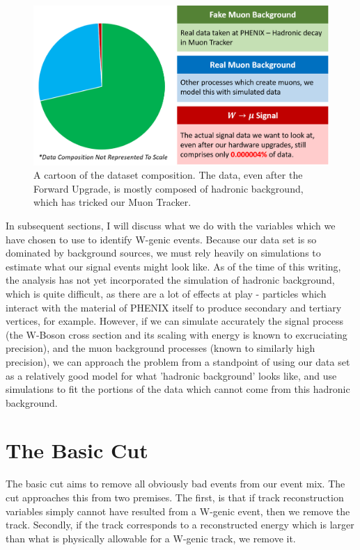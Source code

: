 \begin{figure}[ht]
  \centering
  \includegraphics[width=0.8\linewidth]{./figures/data_composition.png}
  \caption{
    A cartoon of the dataset composition. The data, even after the Forward
    Upgrade, is mostly composed of hadronic background, which has tricked our
    Muon Tracker.
  }
  \label{fig:data_composition}
\end{figure}

In subsequent sections, I will discuss what we do with the variables which we
have chosen to use to identify W-genic events. Because our data set is so
dominated by background sources, we must rely heavily on simulations to estimate
what our signal events might look like. As of the time of this writing, the
analysis has not yet incorporated the simulation of hadronic background, which
is quite difficult, as there are a lot of effects at play - particles which
interact with the material of PHENIX itself to produce secondary and tertiary
vertices, for example. However, if we can simulate accurately the signal process
(the W-Boson cross section and its scaling with energy is known to excruciating
precision), and the muon background processes (known to similarly high
precision), we can approach the problem from a standpoint of using our data set
as a relatively good model for what 'hadronic background' looks like, and use
simulations to fit the portions of the data which cannot come from this hadronic
background. 

\clearpage
\section{The Basic Cut}

The basic cut aims to remove all obviously bad events from our event mix. The
cut approaches this from two premises. The first, is that if track
reconstruction variables simply cannot have resulted from a W-genic event, then
we remove the track. Secondly, if the track corresponds to a reconstructed
energy which is larger than what is physically allowable for a W-genic track, we
remove it.

